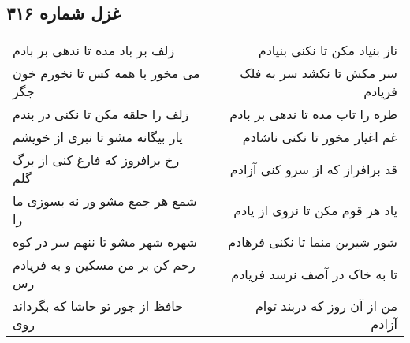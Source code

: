 \begin{center}
\section*{غزل شماره ۳۱۶}
\label{sec:sh316}
\begin{longtable}{l p{0.5cm} r}
زلف بر باد مده تا ندهی بر بادم
&&
ناز بنیاد مکن تا نکنی بنیادم
\\
می مخور با همه کس تا نخورم خون جگر
&&
سر مکش تا نکشد سر به فلک فریادم
\\
زلف را حلقه مکن تا نکنی در بندم
&&
طره را تاب مده تا ندهی بر بادم
\\
یار بیگانه مشو تا نبری از خویشم
&&
غم اغیار مخور تا نکنی ناشادم
\\
رخ برافروز که فارغ کنی از برگ گلم
&&
قد برافراز که از سرو کنی آزادم
\\
شمع هر جمع مشو ور نه بسوزی ما را
&&
یاد هر قوم مکن تا نروی از یادم
\\
شهره شهر مشو تا ننهم سر در کوه
&&
شور شیرین منما تا نکنی فرهادم
\\
رحم کن بر من مسکین و به فریادم رس
&&
تا به خاک در آصف نرسد فریادم
\\
حافظ از جور تو حاشا که بگرداند روی
&&
من از آن روز که دربند توام آزادم
\\
\end{longtable}
\end{center}
